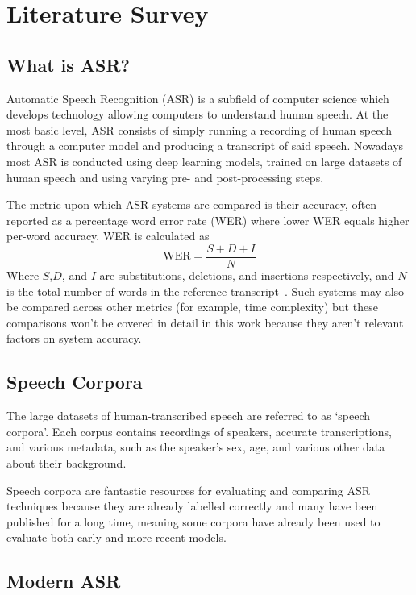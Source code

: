 \chapter{Literature Survey}\label{ch:literature-survey}

\section{What is ASR?}\label{sec:what-is-asr?}

Automatic Speech Recognition (ASR) is a subfield of computer science which develops technology
allowing computers to understand human speech.
At the most basic level, ASR consists of simply running a recording of human speech through a
computer model and producing a transcript of said speech.
Nowadays most ASR is conducted using deep learning models, trained on large datasets of human
speech and using varying pre- and post-processing steps.

The metric upon which ASR systems are compared is their accuracy, often reported as a percentage
word error rate (WER) where lower WER equals higher per-word accuracy.
WER is calculated as
\[
    \text{WER} = \frac{S + D + I}{N}
\]
Where $S$,$D$, and $I$ are substitutions, deletions, and insertions respectively, and $N$ is the
total number of words in the reference transcript~\cite{gaikwad2010review}.
Such systems may also be compared across other metrics (for example, time complexity) but these
comparisons won't be covered in detail in this work because they aren't relevant factors on system
accuracy.

\section{Speech Corpora}\label{sec:speech-corpora}

The large datasets of human-transcribed speech are referred to as `speech corpora'.
Each corpus contains recordings of speakers, accurate transcriptions, and various metadata, such as
the speaker's sex, age, and various other data about their background.

Speech corpora are fantastic resources for evaluating and comparing ASR techniques because they
are already labelled correctly and many have been published for a long time, meaning some corpora
have already been used to evaluate both early and more recent models.

\section{Modern ASR}\label{sec:modern-asr}

